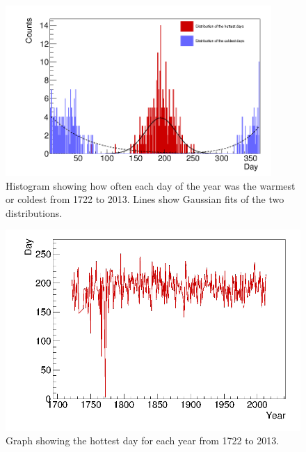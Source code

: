 \begin{figure}[H]
\begin{center}
\includegraphics[width=0.9\textwidth]{HottestColdest.png}
\caption{Histogram showing how often each day of the year was the warmest or coldest from 1722 to 2013. Lines show Gaussian fits of the two distributions.}
\label{fig:HotColdHist}
\end{center}
\end{figure}

\begin{figure}[H]
\begin{center}
\includegraphics[width=13cm]{graph1DHot.png}
\caption{Graph showing the hottest day for each year from 1722 to 2013.}
\label{fig:HotGraph}
\end{center}
\end{figure}

